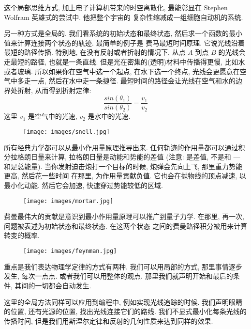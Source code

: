 这个局部思维方式, 加上电子计算机带来的时空离散化, 最能彰显在 Stephen Wolfram 英雄式的尝试中. 他把整个宇宙的
复杂性缩减成一组细胞自动机的系统.

另一种方式是全局的. 我们看系统的初始状态和最终状态, 然后求一个函数的最小值来计算连接两个状态的轨迹. 最简单的例子是
费马最短时间原理. 它说光线沿着最短的路径传播. 特别地, 在没有反射或者折射的情况下, 从点 $A$ 到点 $B$ 的光线会走最短的路径,
也就是一条直线. 但是光在密集的(透明)材料中传播得更慢, 比如水或者玻璃. 所以如果你在空气中选一个起点, 在水下选一个终点,
光线会更愿意在空气中多走一点, 然后在水中走一条捷径. 最短时间的路径会让光线在空气和水的边界处折射, 从而得到折射定律:
\begin{equation*}
  \frac{sin(\theta_1)}{sin(\theta_2)} = \frac{v_1}{v_2}
\end{equation*}
这里 $v_1$ 是空气中的光速, $v_2$ 是水中的光速.

\begin{figure}[H]
  \centering
  \texttt{[image: images/snell.jpg]}
\end{figure}

\noindent
所有经典力学都可以从最小作用量原理推导出来. 任何轨迹的作用量都可以通过积分拉格朗日量来计算, 拉格朗日量是动能和势能的差值
(注意: 是差值, 不是和 --- 和是总能量). 当你发射迫击炮打一个目标的时候, 炮弹会先向上飞, 那里重力势能更高, 然后花一些时间
在那里, 为作用量贡献负值. 它也会在抛物线的顶点减速, 以最小化动能. 然后它会加速, 快速穿过势能较低的区域.

\begin{figure}[H]
  \centering
  \texttt{[image: images/mortar.jpg]}
\end{figure}

\noindent
费曼最伟大的贡献是意识到最小作用量原理可以推广到量子力学. 在那里, 再一次, 问题被表述为初始状态和最终状态. 在这两个状态
之间的费曼路径积分被用来计算转变的概率.

\begin{figure}[H]
  \centering
  \texttt{[image: images/feynman.jpg]}
\end{figure}

\noindent
重点是我们表达物理学定律的方式有两种. 我们可以用局部的方式, 那里事情逐步发生, 每次一点点. 或者我们可以用整体的观点.
那里我们就声明开始和最后的条件, 其间的一切都会自动发生.

这里的全局方法同样可以应用到编程中, 例如实现光线追踪的时候. 我们声明眼睛的位置, 还有光源的位置, 找出光线连接它们的路线.
我们不显式最小化每条光线的传播时间, 但是我们用斯涅尔定律和反射的几何性质来达到同样的效果.

